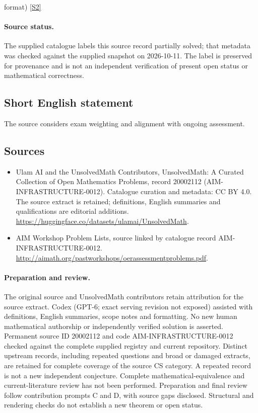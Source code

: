 \documentclass[11pt]{article}
\newcommand{\sref}[2]{\hyperlink{source:#1:#2}{[S#2]}}
\begin{document}
format) \sref{20002112}{2}
\paragraph{Source status.}
The supplied catalogue labels this source record partially solved; that metadata was checked against the supplied snapshot on 2026-10-11. The label is preserved for provenance and is not an independent verification of present open status or mathematical correctness.
\subsection{Short English statement}
The source considers exam weighting and alignment with ongoing assessment.
\subsection{Sources}
\begin{itemize}
\item[\hypertarget{source:20002112:1}{S1}] Ulam AI and the UnsolvedMath Contributors, UnsolvedMath: A Curated Collection of Open Mathematics Problems, record 20002112 (AIM-INFRASTRUCTURE-0012). Catalogue curation and metadata: CC BY 4.0. The source extract is retained; definitions, English summaries and qualifications are editorial additions.
\url{https://huggingface.co/datasets/ulamai/UnsolvedMath}.
\item[\hypertarget{source:20002112:2}{S2}] AIM Workshop Problem Lists, source linked by catalogue record AIM-INFRASTRUCTURE-0012.
\url{http://aimath.org/pastworkshops/oerassessmentproblems.pdf}.
\end{itemize}
\paragraph{Preparation and review.}
The original source and UnsolvedMath contributors retain attribution for the source extract. Codex (GPT-6; exact serving revision not exposed) assisted with definitions, English summaries, scope notes and formatting. No new human mathematical authorship or independently verified solution is asserted. Permanent source ID 20002112 and code AIM-INFRASTRUCTURE-0012 checked against the complete supplied registry and current repository. Distinct upstream records, including repeated questions and broad or damaged extracts, are retained for complete coverage of the source CS category. A repeated record is not a new independent conjecture. Complete mathematical-equivalence and current-literature review has not been performed. Preparation and final review follow contribution prompts C and D, with source gaps disclosed. Structural and rendering checks do not establish a new theorem or open status.
\label{end:20002112}
\end{document}
